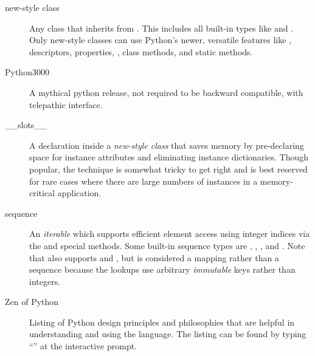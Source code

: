 \begin{description}
\item[new-style class]
Any class that inherits from .  This includes all
built-in types like  and .  Only new-style
classes can use Python's newer, versatile features like
{}, descriptors, properties,
, class methods, and static methods.

\item[Python3000]
A mythical python release, not required to be backward compatible, with
telepathic interface.

\item[__slots__]
A declaration inside a \emph{new-style class} that saves memory by
pre-declaring space for instance attributes and eliminating instance
dictionaries.  Though popular, the technique is somewhat tricky to get
right and is best reserved for rare cases where there are large
numbers of instances in a memory-critical application.

\item[sequence]
An \emph{iterable} which supports efficient element access using
integer indices via the  and
{} special methods.  Some built-in sequence types
are , , , and .
Note that  also supports  and
{}, but is considered a mapping rather than a
sequence because the lookups use arbitrary \emph{immutable} keys
rather than integers.

\item[Zen of Python]
Listing of Python design principles and philosophies that are helpful
in understanding and using the language.  The listing can be found by
typing ``'' at the interactive prompt.

\end{description}
